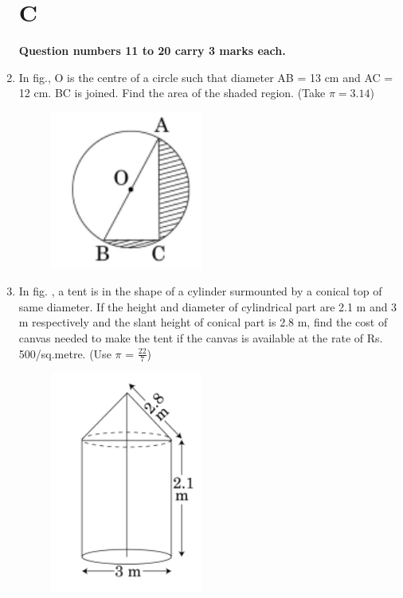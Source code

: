 \documentclass[journal,12pt,twocolumn]{IEEEtran}
\begin{document}
\begin{enumerate}
\section{\textbf{C}}
\textbf{Question numbers 11 to 20 carry 3 marks each.} \\

\item  In fig., O is the centre of a circle such that diameter AB = 13 cm and AC = 12 cm. BC is joined. Find the area of the shaded region. (Take $\pi = 3.14$)\\

	\begin{figure}[H]
      \centering
      \includegraphics[width=5cm]{4.png}
      \label{fig:my_label}
\end{figure} 

\item  In fig. , a tent is in the shape of a cylinder surmounted by a conical top of same diameter. If the height and diameter of cylindrical part are 2.1 m and 3 m respectively and the slant height of conical part is 2.8 m, find the cost of canvas needed to make the tent if the canvas is available at the rate of Rs. 500/sq.metre. (Use $\pi$ = $\frac{22}{7}$)\\
	\begin{figure}[H]
      \centering
      \includegraphics[width=5cm]{5.png}
      \label{fig:my_label}
\end{figure} 


\end{enumerate}
\end{document}

